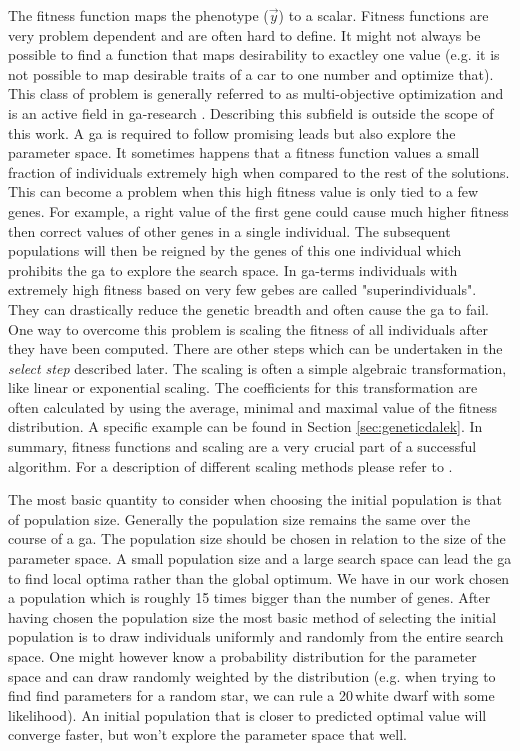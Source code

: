 The fitness function maps the phenotype ($\vec{y}$) to a scalar. Fitness functions are very problem dependent and are often hard to define. It might not always be possible to find a function that maps desirability to exactley one value (e.g. it is not possible to map desirable traits of a car to one number and optimize that). This class of problem is generally referred to as multi-objective optimization and is an active field in \gls{ga}-research \citep{citeulike:1300532}. Describing this subfield is outside the scope of this work. A \gls{ga} is required to follow promising leads but also explore the parameter space. It sometimes happens that a fitness function values a small fraction of individuals extremely high when compared to the rest of the solutions. This can become a problem when this high fitness value is only tied to a few genes. For example, a right value of the first gene could cause much higher fitness then correct values of other genes in a single individual. The subsequent populations will then be reigned by the genes of this one individual which prohibits the \gls{ga} to explore the search space.  In \gls{ga}-terms individuals with extremely high fitness based on very few gebes are called "superindividuals". They can drastically reduce the genetic breadth and often cause the \gls{ga} to fail. One way to overcome this problem is scaling the fitness of all individuals after they have been computed. There are other steps which can be undertaken in the \textit{select step} described later. The scaling is often a simple algebraic transformation, like linear or exponential scaling. The coefficients for this transformation are often calculated by using the average, minimal and maximal value of the fitness distribution. A specific example can be found in Section \ref{sec:geneticdalek}. In summary, fitness functions and scaling are a very crucial part of a successful algorithm. For a description of different scaling methods please refer to \citet{Kreinovich93geneticalgorithms}.

The most basic quantity to consider when choosing the initial population is that of population size. Generally the population size remains the same over the course of a \gls{ga}. The population size should be chosen in relation to the size of the parameter space. A small population size and a large search space can lead the \gls{ga} to find local optima rather than the global optimum. We have in our work chosen a population which is roughly 15 times bigger than the number of genes. After having chosen the population size the most basic method of selecting the initial population is to draw individuals uniformly and randomly from the entire search space. One might however know a probability distribution for the parameter space and can draw randomly weighted by the distribution (e.g. when trying to find find parameters for a random star, we can rule a 20\,\msun white dwarf with some likelihood). An initial population that is closer to predicted optimal value will converge faster, but won't explore the parameter space that well. 

